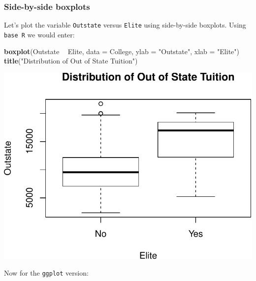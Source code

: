 \documentclass[]{article}
\newenvironment{Shaded}{\begin{snugshade}}{\end{snugshade}}
\newcommand{\KeywordTok}[1]{\textcolor[rgb]{0.13,0.29,0.53}{\textbf{#1}}}
\newcommand{\DataTypeTok}[1]{\textcolor[rgb]{0.13,0.29,0.53}{#1}}
\newcommand{\StringTok}[1]{\textcolor[rgb]{0.31,0.60,0.02}{#1}}
\newcommand{\OperatorTok}[1]{\textcolor[rgb]{0.81,0.36,0.00}{\textbf{#1}}}
\newcommand{\NormalTok}[1]{#1}
\begin{document}
\subsubsection{Side-by-side boxplots}\label{side-by-side-boxplots}

Let's plot the variable \texttt{Outstate} versus \texttt{Elite} using
side-by-side boxplots. Using \texttt{base\ R} we would enter:

\begin{Shaded}
\begin{Highlighting}[]
\KeywordTok{boxplot}\NormalTok{(Outstate }\OperatorTok{~}\StringTok{ }\NormalTok{Elite, }\DataTypeTok{data =}\NormalTok{ College, }\DataTypeTok{ylab =} \StringTok{"Outstate"}\NormalTok{, }\DataTypeTok{xlab =} \StringTok{"Elite"}\NormalTok{)}
\KeywordTok{title}\NormalTok{(}\StringTok{"Distribution of Out of State Tuition"}\NormalTok{)}
\end{Highlighting}
\end{Shaded}

\begin{center}\includegraphics{Lab1Q_files/figure-latex/unnamed-chunk-9-1} \end{center}

Now for the \texttt{ggplot} version:
\end{document}
